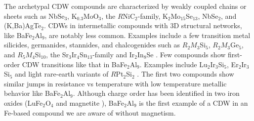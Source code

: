 \documentclass[journal=cmatex,manuscript=article]{achemso}
\begin{document}
The archetypal CDW compounds are characterized by weakly coupled chains or sheets such as NbSe$_3$, K$_{0.3}$MoO$_3$, the $R$NiC$_2$-family, K$_2$Mo$_{15}$Se$_{13}$, NbSe$_2$, and (K,Ba)AgTe$_2$.\cite{Gruner1994_DensityWavesInSolids,Steiner2018_SingleCrystalStudyCDW-LuNiC2,Roman2018_PhaseDiagramOfRNiC2-Family,Candolfi2020_CDW+SC_K2Mo15Se19,Gourdon2000_KBaAgTe2-CDWstructure} CDWs in intermetallic compounds with 3D structural networks, like BaFe$_2$Al$_9$, are notably less common. Examples include a few transition metal silicides, germanides, stannides, and chalcogenides such as $R_2M_3$Si$_5$,\cite{Ramakrishnan2020_CDWinEr2Ir3Si5,Singh2005_CDWinLu2Ir3Si5,Sangeetha2012_CDWdopedLu2Ir3Si5} $R_2M_3$Ge$_5$,\cite{Bugaris2017_CDW-R2Ru3Ge5} and $R_5M_4$Si$_{10}$\cite{Kuo2001_ThermalPropCDW-Lu5Ir4Si10,Kuo2003_IonicSizeCDW-R5Ir4Si10,Lue2002_HysteresisOfCDW-Lu5Rh4Si10,Yang1991_PhaseTransistions-Lu5Rh4Si10}, the Sr$_3$Ir$_4$Sn$_{13}$-family\cite{Klintberg2012_QuantumPhaseTransititionSr3Ir4Sn13,Welsch2019_CDW-La3Co4Sn13} and Ir$_2$In$_8$Se \cite{Khoury2020_Ir2In8Q-DiracSemimetal+StructuralModulation}. Few compounds show first-order CDW transitions like that in BaFe$_2$Al$_9$. Examples include Lu$_2$Ir$_3$Si$_5$, Er$_2$Ir$_3$Si$_5$ \cite{Singh2005_CDWinLu2Ir3Si5,Ramakrishnan2020_CDWinEr2Ir3Si5} and light rare-earth variants of $R$Pt$_2$Si$_2$ \cite{Nagano2013_CDW+SC-RPt2Si2}. The first two compounds show similar jumps in resistance vs temperature with low temperature metallic behavior like BaFe$_2$Al$_9$. Although charge order has been identified in two iron oxides (LuFe$_2$O$_4$ \cite{Ikeda2005_FerroelectricityFromFeValanceOrderInLuFe2O4} and magnetite \cite{Walz2002_TheVerweyTransition}), BaFe$_2$Al$_9$ is the first example of a CDW in an Fe-based compound we are aware of without magnetism.

\end{document}
